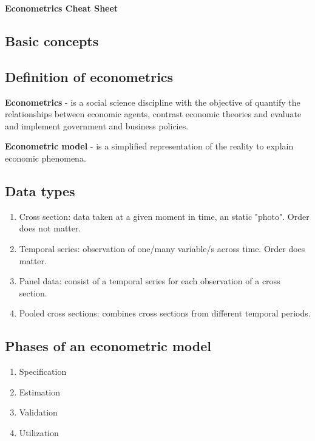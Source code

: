 \documentclass[10pt,landscape]{article}
\begin{document}
\begin{center}
\textbf{\Large Econometrics Cheat Sheet}
\end{center}
\begin{multicols}{3} %

\section*{Basic concepts}

\subsection*{Definition of econometrics}

\textbf{Econometrics} - is a social science discipline with the objective of quantify the relationships between economic agents, contrast economic theories and evaluate and implement government and business policies.

\textbf{Econometric model} - is a simplified representation of the reality to explain economic phenomena.

\subsection*{Data types}

\begin{enumerate}
\item Cross section: data taken at a given moment in time, an static "photo". Order does not matter.
\item Temporal series: observation of one/many variable/s across time. Order does matter.
\item Panel data: consist of a temporal series for each observation of a cross section.
\item Pooled cross sections: combines cross sections from different temporal periods.
\end{enumerate}

\subsection*{Phases of an econometric model}

\begin{enumerate}
\item Specification
\item Estimation
\item Validation
\item Utilization
\end{enumerate}


\end{multicols}
\end{document}
